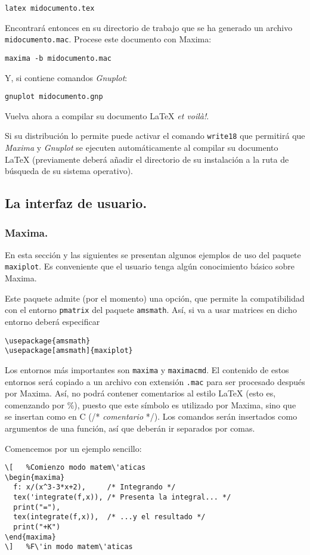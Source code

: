\documentclass[11pt,a4paper]{article}
\def\Maxima{\emph{Maxima}}
\def\Gnuplot{\emph{Gnuplot}}
\begin{document}
\texttt{latex midocumento.tex}

Encontrar\'a entonces en su directorio de trabajo que se ha generado un archivo
\texttt{midocumento.mac}. Procese este documento con Maxima:

\texttt{maxima -b midocumento.mac}

Y, si contiene comandos \Gnuplot:

\texttt{gnuplot midocumento.gnp}

Vuelva ahora a compilar su documento \LaTeX{} \textit{et voil\`a!}.

Si su distribuci\'on lo permite puede activar el comando \texttt{write18} que permitir\'a
que \Maxima{} y \Gnuplot{} se ejecuten autom\'aticamente al compilar su documento \LaTeX{} (previamente
deber\'a a\~nadir el directorio de su instalaci\'on a la ruta de b\'usqueda
de su sistema operativo). 

\subsection{La interfaz de usuario.}
\subsubsection{Maxima.}
En esta secci\'on y las siguientes se presentan algunos ejemplos de uso del paquete \texttt{maxiplot}.
Es conveniente que el usuario tenga alg\'un conocimiento b\'asico sobre Maxima.

Este paquete admite (por el momento) una opci\'on, que permite la compatibilidad
con el entorno \texttt{pmatrix} del paquete \texttt{amsmath}. As\'i, si va a usar
matrices en dicho entorno deber\'a especificar
\begin{verbatim}
\usepackage{amsmath}
\usepackage[amsmath]{maxiplot}
\end{verbatim}

Los entornos m\'as importantes son \texttt{maxima} y \texttt{maximacmd}.
El contenido de estos entornos ser\'a copiado a un archivo con extensi\'on \texttt{.mac}
para ser procesado despu\'es por Maxima. As\'i, no podr\'a contener comentarios 
al estilo \LaTeX{} (esto es, comenzando por \%), puesto que este s\'imbolo es utilizado 
por Maxima, sino que se insertan como en C (/* \textit{comentario} */). Los comandos
ser\'an insertados como argumentos de una funci\'on, as\'i que deber\'an ir separados por comas.
\pagebreak

Comencemos por un ejemplo sencillo:
\begin{verbatim}
\[   %Comienzo modo matem\'aticas
\begin{maxima}
  f: x/(x^3-3*x+2),     /* Integrando */
  tex('integrate(f,x)), /* Presenta la integral... */
  print("="),
  tex(integrate(f,x)),  /* ...y el resultado */
  print("+K")
\end{maxima}
\]   %F\'in modo matem\'aticas
\end{verbatim}
\end{document}
